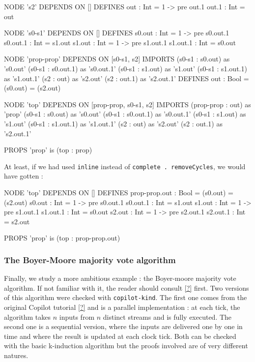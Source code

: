 \begin{code}
NODE 's2' DEPENDS ON []
DEFINES
    out : Int =
        1 -> pre out.1
    out.1 : Int =
        out

NODE 's0-s1' DEPENDS ON []
DEFINES
    s0.out : Int =
        1 -> pre s0.out.1
    s0.out.1 : Int =
        s1.out
    s1.out : Int =
        1 -> pre s1.out.1
    s1.out.1 : Int =
        s0.out

NODE 'prop-prop' DEPENDS ON [s0-s1, s2]
IMPORTS
    (s0-s1 : s0.out) as 's0.out'
    (s0-s1 : s0.out.1) as 's0.out.1'
    (s0-s1 : s1.out) as 's1.out'
    (s0-s1 : s1.out.1) as 's1.out.1'
    (s2 : out) as 's2.out'
    (s2 : out.1) as 's2.out.1'
DEFINES
    out : Bool =
        (s0.out) = (s2.out)

NODE 'top' DEPENDS ON [prop-prop, s0-s1, s2]
IMPORTS
    (prop-prop : out) as 'prop'
    (s0-s1 : s0.out) as 's0.out'
    (s0-s1 : s0.out.1) as 's0.out.1'
    (s0-s1 : s1.out) as 's1.out'
    (s0-s1 : s1.out.1) as 's1.out.1'
    (s2 : out) as 's2.out'
    (s2 : out.1) as 's2.out.1'

PROPS
'prop' is (top : prop)
\end{code}
At least, if we had used \texttt{inline} instead of \texttt{complete . removeCycles}, we would have gotten :
\begin{code}
NODE 'top' DEPENDS ON []
DEFINES
    prop-prop.out : Bool =
        (s0.out) = (s2.out)
    s0.out : Int =
        1 -> pre s0.out.1
    s0.out.1 : Int =
        s1.out
    s1.out : Int =
        1 -> pre s1.out.1
    s1.out.1 : Int =
        s0.out
    s2.out : Int =
        1 -> pre s2.out.1
    s2.out.1 : Int =
        s2.out

PROPS
'prop' is (top : prop-prop.out)
\end{code}


\subsubsection{The Boyer-Moore majority vote algorithm}

Finally, we study a more ambitious example : the Boyer-moore majority vote algorithm. If not familiar with it, the reader should consult \ref{?} first. Two versions of this algorithm were checked with \texttt{copilot-kind}. The first one comes from the original Copilot tutorial \ref{?} and is a parallel implementation : at each tick, the algorithm takes $n$ inputs from $n$ distinct streams and is fully executed. The second one is a sequential version, where the inputs are delivered one by one in time and where the result is updated at each clock tick. Both can be checked with the basic k-induction algorithm but the proofs involved are of very different natures.


